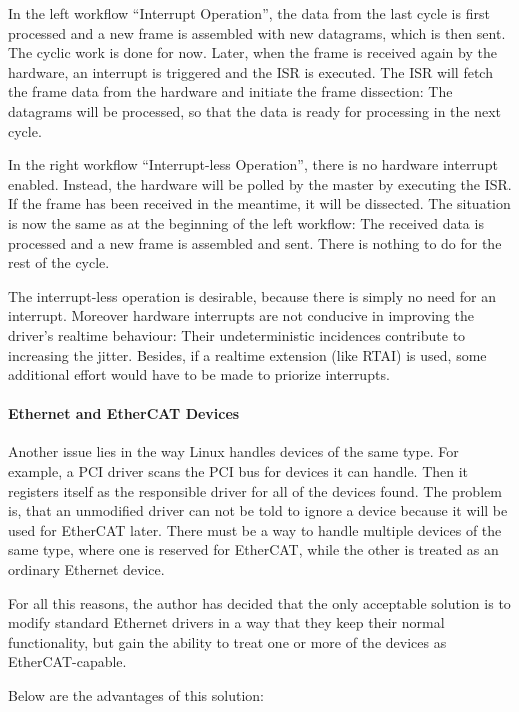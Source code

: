 \documentclass[a4paper,12pt,BCOR6mm,bibtotoc,idxtotoc]{scrbook}
\begin{document}
In the left workflow ``Interrupt Operation'', the data from the last
cycle is first processed and a new frame is assembled with new
datagrams, which is then sent.  The cyclic work is done for now.
Later, when the frame is received again by the hardware, an interrupt
is triggered and the ISR is executed. The ISR will fetch the frame
data from the hardware and initiate the frame dissection: The
datagrams will be processed, so that the data is ready for processing
in the next cycle.

In the right workflow ``Interrupt-less Operation'', there is no
hardware interrupt enabled.  Instead, the hardware will be polled by
the master by executing the ISR. If the frame has been received in the
meantime, it will be dissected. The situation is now the same as at
the beginning of the left workflow: The received data is processed and
a new frame is assembled and sent. There is nothing to do for the rest
of the cycle.

The interrupt-less operation is desirable, because there is simply no
need for an interrupt. Moreover hardware interrupts are not conducive
in improving the driver's realtime behaviour: Their undeterministic
incidences contribute to increasing the jitter. Besides, if a realtime
extension (like RTAI) is used, some additional effort would have to be
made to priorize interrupts.

\paragraph{Ethernet and EtherCAT Devices}

Another issue lies in the way Linux handles devices of the same type.
For example, a PCI driver scans the PCI bus for devices it
can handle. Then it registers itself as the responsible driver for all
of the devices found. The problem is, that an unmodified driver can
not be told to ignore a device because it will be used for EtherCAT
later. There must be a way to handle multiple devices of the same
type, where one is reserved for EtherCAT, while the other is treated
as an ordinary Ethernet device.

For all this reasons, the author has decided that the only acceptable
solution is to modify standard Ethernet drivers in a way that they
keep their normal functionality, but gain the ability to treat one or
more of the devices as EtherCAT-capable.

Below are the advantages of this solution:
\end{document}
